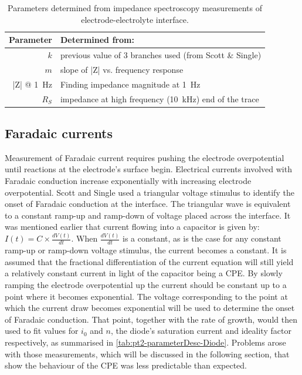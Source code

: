     \begin{table}
      \begin{center}
        \begin{tabular} {r | l}
          Parameter & Determined from:\\
          \hline
          $k$ & previous value of 3 branches used (from Scott \& Single)\\
          $m$ & slope of |Z| vs. frequency response\\
          |Z| @ \SI{1}{\hertz} & Finding impedance magnitude at \SI{1}{\hertz}\\
          $R_S$ & impedance at high frequency (\SI{10}{\kilo\hertz}) end of the trace
        \end{tabular}
      \end{center}
      \caption{\label{tab:pt2-parameterDesc-CPE}Parameters determined from impedance spectroscopy measurements of electrode-electrolyte interface.}
    \end{table}


  \subsection{Faradaic currents}
    Measurement of Faradaic current requires pushing the electrode overpotential until reactions at the electrode's surface begin.
    Electrical currents involved with Faradaic conduction increase exponentially with increasing electrode overpotential.
    Scott and Single used a triangular voltage stimulus to identify the onset of Faradaic conduction at the interface.
    The triangular wave is equivalent to a constant ramp-up and ramp-down of voltage placed across the interface.
    It was mentioned earlier that current flowing into a capacitor is given by: $I(t) = C \times \frac{dV(t)}{dt}$.
    When $\frac{dV(t)}{dt}$ is a constant, as is the case for any constant ramp-up or ramp-down voltage stimulus, the current becomes a constant.
    It is assumed that the fractional differentiation of the current equation will still yield a relatively constant current in light of the capacitor being a CPE.
    By slowly ramping the electrode overpotential up the current should be constant up to a point where it becomes exponential.
    The voltage corresponding to the point at which the current draw becomes exponential will be used to determine the onset of Faradaic conduction.
    That point, together with the rate of growth, would then used to fit values for $i_0$ and $n$, the diode's saturation current and ideality factor respectively, as summarised in \cref{tab:pt2-parameterDesc-Diode}.
    Problems arose with those measurements, which will be discussed in the following section, that show the behaviour of the CPE was less predictable than expected.


